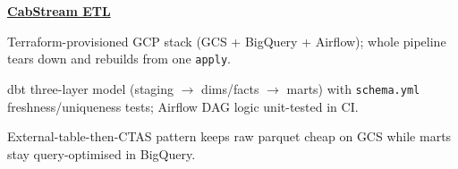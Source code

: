 \begin{twocolentry}{}
\href{https://github.com/faketut/CabStream-ETL}{\textbf{CabStream ETL}}
\end{twocolentry}
\begin{onecolentry}
\begin{highlights}
\item Terraform-provisioned GCP stack (GCS + BigQuery + Airflow); whole pipeline tears down and rebuilds from one \texttt{apply}.
\item dbt three-layer model (staging $\rightarrow$ dims/facts $\rightarrow$ marts) with \texttt{schema.yml} freshness/uniqueness tests; Airflow DAG logic unit-tested in CI.
\item External-table-then-CTAS pattern keeps raw parquet cheap on GCS while marts stay query-optimised in BigQuery.
\end{highlights}
\end{onecolentry}
